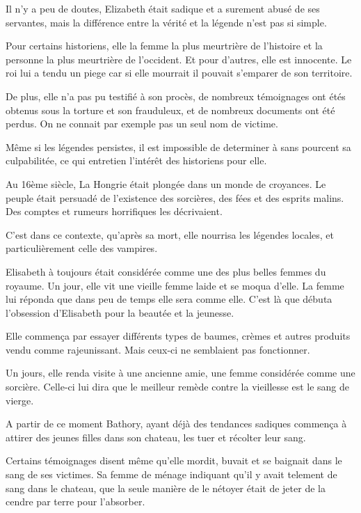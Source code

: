 \documentclass[a4paper, 12pt]{article}
\begin{document}
    Il n'y a peu de doutes, Elizabeth était sadique et a surement abusé de ses 
    servantes, mais la différence entre la vérité et la légende n'est pas si 
    simple.

    Pour certains historiens, elle la femme la plus meurtrière de l'histoire
    et la personne la plus meurtrière de l'occident. Et pour d'autres, elle est
    innocente. Le roi lui a tendu un piege car si elle mourrait il pouvait
    s'emparer de son territoire.

    De plus, elle n'a pas pu testifié à son procès, de nombreux témoignages ont
    étés obtenus sous la torture et son frauduleux, et de nombreux documents ont
    été perdus. On ne connait par exemple pas un seul nom de victime.

    Même si les légendes persistes, il est impossible de determiner à sans
    pourcent sa culpabilitée, ce qui entretien l'intérêt des historiens pour
    elle.

    Au 16ème siècle, La Hongrie était plongée dans un monde de croyances. Le
    peuple était persuadé de l'existence des sorcières, des fées et des 
    esprits malins. Des comptes et rumeurs horrifiques les décrivaient.
    
    C'est dans ce contexte, qu'après sa mort, elle nourrisa les légendes
    locales, et particulièrement celle des vampires.

    Elisabeth à toujours était considérée comme une des plus belles femmes du
    royaume. Un jour, elle vit une vieille femme laide et se moqua d'elle. La
    femme lui réponda que dans peu de temps elle sera comme elle. C'est là que
    débuta l'obsession d'Elisabeth pour la beautée et la jeunesse.

    Elle commença par essayer différents types de baumes, crèmes et autres
    produits vendu comme rajeunissant. Mais ceux-ci ne semblaient pas
    fonctionner.

    Un jours, elle renda visite à une ancienne amie, une femme considérée comme
    une sorcière. Celle-ci lui dira que le meilleur remède contre la vieillesse
    est le sang de vierge.

    A partir de ce moment Bathory, ayant déjà des tendances sadiques commença à
    attirer des jeunes filles dans son chateau, les tuer et récolter leur sang.

    Certains témoignages disent même qu'elle mordit, buvait et se baignait dans
    le sang de ses victimes. Sa femme de ménage indiquant qu'il y avait telement
    de sang dans le chateau, que la seule manière de le nétoyer était de jeter
    de la cendre par terre pour l'absorber.
\end{document}
